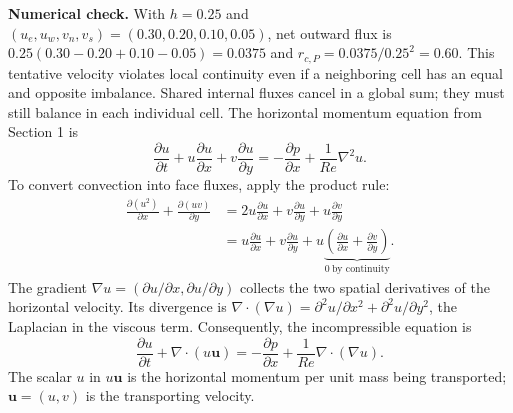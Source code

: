 \textbf{Numerical check.} With $h=0.25$ and
$(u_e,u_w,v_n,v_s)=(0.30,0.20,0.10,0.05)$, net outward flux is
$0.25(0.30-0.20+0.10-0.05)=0.0375$ and $r_{c,P}=0.0375/0.25^2=0.60$.
This tentative velocity violates local continuity even if a neighboring cell
has an equal and opposite imbalance. Shared internal fluxes cancel in a global
sum; they must still balance in each individual cell.
\newpage
{}
The horizontal momentum equation from Section 1 is
\[
\frac{\partial u}{\partial t}+u\frac{\partial u}{\partial x}
+v\frac{\partial u}{\partial y}
=-\frac{\partial p}{\partial x}+\frac{1}{Re}\nabla^2u.
\]
To convert convection into face fluxes, apply the product rule:
\begin{align*}
\frac{\partial(u^2)}{\partial x}+\frac{\partial(uv)}{\partial y}
&=2u\frac{\partial u}{\partial x}+v\frac{\partial u}{\partial y}
+u\frac{\partial v}{\partial y}\\
&=u\frac{\partial u}{\partial x}+v\frac{\partial u}{\partial y}
+u\underbrace{\left(\frac{\partial u}{\partial x}+\frac{\partial v}{\partial y}\right)}_{0\ \text{by continuity}}.
\end{align*}
The gradient $\nabla u=(\partial u/\partial x,\partial u/\partial y)$ collects
the two spatial derivatives of the horizontal velocity. Its divergence is
$\nabla\cdot(\nabla u)=\partial^2u/\partial x^2+\partial^2u/\partial y^2$,
the Laplacian in the viscous term. Consequently, the incompressible equation is
\[
\frac{\partial u}{\partial t}+\nabla\cdot(u\boldsymbol u)
=-\frac{\partial p}{\partial x}+\frac{1}{Re}\nabla\cdot(\nabla u).
\]
The scalar $u$ in $u\boldsymbol u$ is the horizontal momentum per unit mass
being transported; $\boldsymbol u=(u,v)$ is the transporting velocity.

